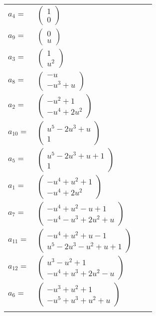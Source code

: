\documentclass[1p]{elsarticle_modified}
\theoremstyle{definition}
\begin{document}
\begin{tabular}{m{7pt} m{180pt} m{7pt} m{180pt} }
\flushright $a_{4}=$&$\begin{pmatrix}1\\0\end{pmatrix}$ \\
\flushright $a_{9}=$&$\begin{pmatrix}0\\u\end{pmatrix}$ \\
\flushright $a_{3}=$&$\begin{pmatrix}1\\u^2\end{pmatrix}$ \\
\flushright $a_{8}=$&$\begin{pmatrix}- u\\- u^3+u\end{pmatrix}$ \\
\flushright $a_{2}=$&$\begin{pmatrix}- u^2+1\\- u^4+2 u^2\end{pmatrix}$ \\
\flushright $a_{10}=$&$\begin{pmatrix}u^5-2 u^3+u\\1\end{pmatrix}$ \\
\flushright $a_{5}=$&$\begin{pmatrix}u^5-2 u^3+u+1\\1\end{pmatrix}$ \\
\flushright $a_{1}=$&$\begin{pmatrix}- u^4+u^2+1\\- u^4+2 u^2\end{pmatrix}$ \\
\flushright $a_{7}=$&$\begin{pmatrix}- u^4+u^2- u+1\\- u^4- u^3+2 u^2+u\end{pmatrix}$ \\
\flushright $a_{11}=$&$\begin{pmatrix}- u^4+u^2+u-1\\u^5-2 u^3- u^2+u+1\end{pmatrix}$ \\
\flushright $a_{12}=$&$\begin{pmatrix}u^3- u^2+1\\- u^4+u^3+2 u^2- u\end{pmatrix}$ \\
\flushright $a_{6}=$&$\begin{pmatrix}- u^3+u^2+1\\- u^5+u^3+u^2+u\end{pmatrix}$\\&\end{tabular}
\end{document}
